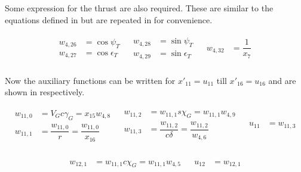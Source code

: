 Some expression for the thrust are also required. These are similar to the equations defined in  but are repeated in  for convenience. 

\begin{align} \label{eq:thrustAuxF}
\begin{split}
w_{4,26} &= \cos \psi_{T} \\
w_{4,27} &= \cos \epsilon_{T} \\
\end{split}
&
\begin{split}
w_{4,28} &= \sin \psi_{T} \\
w_{4,29} &= \sin \epsilon_{T} \\
\end{split}
&
\begin{split}
w_{4,32} &= \dfrac{1}{x_{7}} \\
\end{split}
\end{align}


Now the auxiliary functions can be written for $x'_{11} = u_{11}$ till $x'_{16} = u_{16}$ and are shown in  respectively. 

\begin{align} \label{eq:auxF11}
\begin{split}
w_{11,0} &= V_{G}c\gamma_{G} = x_{15}w_{4,8} \\
w_{11,1} &= \dfrac{w_{11,0}}{r} = \dfrac{w_{11,0}}{x_{16}} \\
\end{split}
&
\begin{split}
w_{11,2} &= w_{11,1}s\chi_{G} = w_{11,1}w_{4,9} \\
w_{11,3} &= \dfrac{w_{11,2}}{c\delta} = \dfrac{w_{11,2}}{w_{4,6}} \\
\end{split}
&
\begin{split}
u_{11} &= w_{11,3} \\
\end{split}
\end{align}

\begin{align} \label{eq:auxF12}
\begin{split}
w_{12,1} &= w_{11,1}c\chi_{G} = w_{11,1}w_{4,5} \\
\end{split}
&
\begin{split}
u_{12} &= w_{12,1} \\
\end{split}
\end{align}

